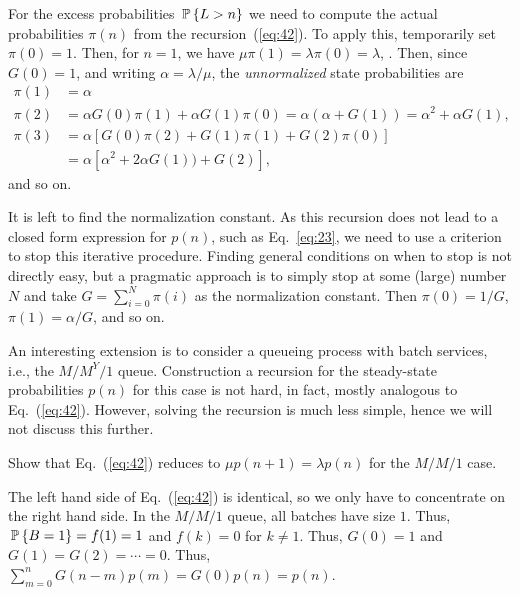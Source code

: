For the excess probabilities $\P{L>n}$ we need to compute the actual
probabilities $\pi(n)$ from the recursion~(\ref{eq:42}). To apply
this, temporarily set $\pi(0)=1$. Then, for $n=1$, we have
$\mu \pi(1) = \lambda \pi(0)=\lambda$, . Then,
since $G(0)=1$, and writing $\alpha = \lambda/\mu$, the
\emph{unnormalized} state probabilities are
\begin{equation*}
  \begin{split}
  \pi(1) &= \alpha \\
  \pi(2) &= \alpha G(0) \pi(1) + \alpha G(1) \pi(0) =\alpha(\alpha+ G(1)) = \alpha^2 + \alpha G(1), \\
  \pi(3) 
&= \alpha[G(0) \pi(2) + G(1) \pi(1) + G(2) \pi(0)]  \\
&= \alpha[ \alpha^2 + 2 \alpha G(1)) + G(2)],
  \end{split}
\end{equation*}
 and so on.  

It is left to find the normalization constant.  As this recursion does
not lead to a closed form expression for $p(n)$, such as
Eq.~\eqref{eq:23}, we need to use a criterion to stop this iterative
procedure. Finding general conditions on when to stop is not directly
easy, but a pragmatic approach is to simply stop at some (large)
number $N$ and take $G=\sum_{i=0}^N \pi(i)$ as the normalization
constant. Then $\pi(0)=1/G$, $\pi(1)=\alpha/G$, and so on.

\begin{remark}
An interesting extension is to consider a queueing process with batch
services, i.e., the $M/M^Y/1$ queue. Construction a recursion for the
steady-state probabilities $p(n)$ for this case is not hard, in fact,
mostly analogous to Eq.~(\ref{eq:42}).  However, solving the recursion
is much less simple, hence we will not discuss this further.
\end{remark}


\begin{question}
  Show that Eq.~(\ref{eq:42}) reduces to $\mu p(n+1)=\lambda p(n)$ for the $M/M/1$ case.
  \begin{solution}
    The left hand side of Eq.~(\ref{eq:42}) is identical, so we only
    have to concentrate on the right hand side. In the $M/M/1$ queue,
    all batches have size $1$. Thus, $\P{B=1} = f(1)=1$ and $f(k)=0$
    for $k\neq 1$. Thus, $G(0)=1$ and $G(1)=G(2)=\cdots = 0$. Thus,
    $\sum_{m=0}^n G(n-m) p(m) = G(0)p(n)=p(n)$.
  \end{solution}
\end{question}

